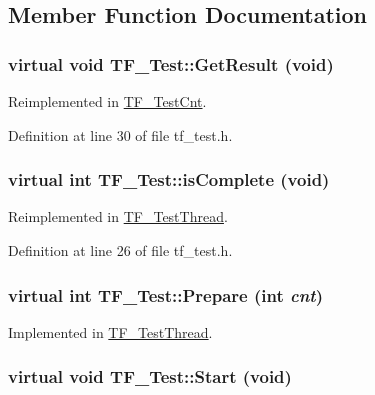 \subsection{Member Function Documentation}
\hypertarget{classTF__Test_a3e4bb4453e490c2a897ccc86b6e788bf}{
\subsubsection[{GetResult}]{\setlength{\rightskip}{0pt plus 5cm}virtual void TF\_\-Test::GetResult (void)}}
\label{classTF__Test_a3e4bb4453e490c2a897ccc86b6e788bf}


Reimplemented in \hyperlink{classTF__TestCnt_af1d8c610c3b708401c19ad8256db27be}{TF\_\-TestCnt}.

Definition at line 30 of file tf\_\-test.h.\hypertarget{classTF__Test_a14768dc0dba16b2cb7be89e8e7c2b3b0}{
\subsubsection[{isComplete}]{\setlength{\rightskip}{0pt plus 5cm}virtual int TF\_\-Test::isComplete (void)}}
\label{classTF__Test_a14768dc0dba16b2cb7be89e8e7c2b3b0}


Reimplemented in \hyperlink{classTF__TestThread_a323fe5eecb67f390ee0fada90ade5ed2}{TF\_\-TestThread}.

Definition at line 26 of file tf\_\-test.h.\hypertarget{classTF__Test_a26630dcec87c80cd27ab33e3791fbe19}{
\subsubsection[{Prepare}]{\setlength{\rightskip}{0pt plus 5cm}virtual int TF\_\-Test::Prepare (int {\em cnt})}}
\label{classTF__Test_a26630dcec87c80cd27ab33e3791fbe19}


Implemented in \hyperlink{classTF__TestThread_acfc9a31db91472deb811a47c1cf8e20f}{TF\_\-TestThread}.\hypertarget{classTF__Test_aab4a87d980709f2756d440771b4e24ac}{
\subsubsection[{Start}]{\setlength{\rightskip}{0pt plus 5cm}virtual void TF\_\-Test::Start (void)}}
\label{classTF__Test_aab4a87d980709f2756d440771b4e24ac}


